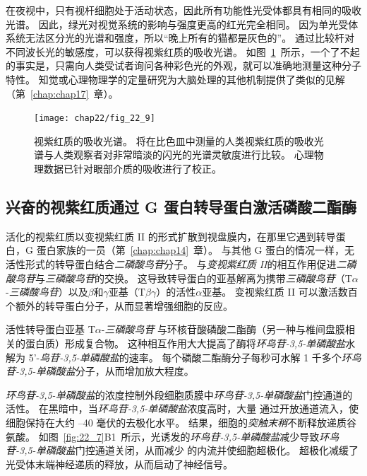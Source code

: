 在夜视中，只有视杆细胞处于活动状态，因此所有功能性光受体都具有相同的吸收光谱。
因此，绿光对视觉系统的影响与强度更高的红光完全相同。
因为单光受体系统无法区分光的光谱和强度，所以“晚上所有的猫都是灰色的”。
通过比较杆对不同波长光的敏感度，可以获得视紫红质的吸收光谱。
如图~\ref{fig:22_9}~所示，一个了不起的事实是，只需向人类受试者询问各种彩色光的外观，就可以准确地测量这种分子特性。
知觉或心理物理学的定量研究为大脑处理的其他机制提供了类似的见解（第~\ref{chap:chap17}~章）。


\begin{figure}[htbp]
	\centering
	\texttt{[image: chap22/fig\_22\_9]}
	\caption{视紫红质的吸收光谱。 
		将在比色皿中测量的人类视紫红质的吸收光谱与人类观察者对非常暗淡的闪光的光谱灵敏度进行比较。
		心理物理数据已针对眼部介质的吸收进行了校正。}
	\label{fig:22_9}
\end{figure}



\subsection{兴奋的视紫红质通过 G 蛋白转导蛋白激活磷酸二酯酶}

活化的视紫红质以变视紫红质 II 的形式扩散到视盘膜内，在那里它遇到转导蛋白，G 蛋白家族的一员（第~\ref{chap:chap14}~章）。
与其他 G 蛋白的情况一样，无活性形式的转导蛋白结合\textit{二磷酸鸟苷}分子。
与\textit{变视紫红质 II}的相互作用促进\textit{二磷酸鸟苷}与\textit{三磷酸鸟苷}的交换。
这导致转导蛋白的亚基解离为携带\textit{三磷酸鸟苷}（T$\alpha$-\textit{三磷酸鸟苷}）以及$\beta$和$\gamma$亚基（T$\beta$$\gamma$）的活性$\alpha$亚基。
变视紫红质 II 可以激活数百个额外的转导蛋白分子，从而显著增强细胞的反应。


活性转导蛋白亚基 T$\alpha$-\textit{三磷酸鸟苷} 与环核苷酸磷酸二酯酶（另一种与椎间盘膜相关的蛋白质）形成复合物。
这种相互作用大大提高了酶将\textit{环鸟苷-3,5-单磷酸盐}水解为 5'-\textit{鸟苷-3,5-单磷酸盐}的速率。
每个磷酸二酯酶分子每秒可水解 1 千多个\textit{环鸟苷-3,5-单磷酸盐}分子，从而增加放大程度。


\textit{环鸟苷-3,5-单磷酸盐}的浓度控制外段细胞质膜中\textit{环鸟苷-3,5-单磷酸盐}门控通道的活性。
在黑暗中，当\textit{环鸟苷-3,5-单磷酸盐}浓度高时，大量  通过开放通道流入，使细胞保持在大约 –40 毫伏的去极化水平。
结果，细胞的\textit{突触末稍}不断释放递质谷氨酸。
如图~\ref{fig:22_7}B1~所示，光诱发的\textit{环鸟苷-3,5-单磷酸盐}减少导致\textit{环鸟苷-3,5-单磷酸盐}门控通道关闭，从而减少  的内流并使细胞超极化。
超极化减缓了光受体末端神经递质的释放，从而启动了神经信号。



